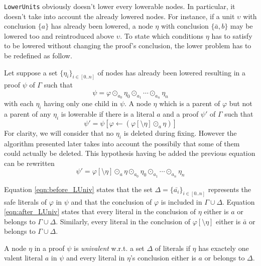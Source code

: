 \documentclass{llncs}
\newcommand{\dual}[1]{{\ensuremath{\bar{#1}}}}
\newcommand{\LowerUnits}{\texttt{LowerUnits}}
\begin{document}
{\LowerUnits} obviously doesn't lower every lowerable nodes. In particular, it doesn't take into
account the already lowered nodes. For instance, if a unit $\upsilon$ with conclusion $\{a\}$ has already been
lowered, a node $\eta$ with conclusion $\{\dual{a},b\}$ may be lowered too and reintroduced above
$\upsilon$. To state which conditions $\eta$ has to satisfy to be lowered without changing the
proof's conclusion, the lower problem has to be redefined as follow.

Let suppose a set $\{\eta_i\}_{i \in [0..n]}$ of nodes has already been lowered resulting in a proof
$\psi$ of $\Gamma$ such that
\begin{equation} \label{eqn:before_LUniv}
  \psi = \varphi \odot_{a_0} \eta_0 \odot_{a_1} \cdots \odot_{a_n} \eta_n
\end{equation}
with each $\eta_i$ having only one child in $\psi$. A node $\eta$ which is a parent of $\varphi$ but
not a parent of any $\eta_i$ is lowerable if there is a literal $a$ and a proof $\psi'$ of
$\Gamma$ such that
\begin{equation}
  \psi' = \psi[\varphi \leftarrow (\varphi[\setminus \eta] \odot_a \eta)]
\end{equation}
For clarity, we will consider that no $\eta_i$ is deleted during fixing. However the algorithm
presented later takes into account the possibily that some of them could actually be deleted. This
hypothesis having be added the previous equation can be rewritten
\begin{equation} \label{eqn:after_LUniv}
  \psi' = \varphi[\setminus \eta] \odot_a \eta \odot_{a_0} \eta_0 \odot_{a_1} \cdots \odot_{a_n} \eta_n
\end{equation}

Equation \ref{eqn:before_LUniv} states that the set $\Delta = \{\dual{a_i}\}_{i \in [0..n]}$
represents the safe literals of $\varphi$ in $\psi$ and that the conclusion of $\varphi$ is included
in $\Gamma \cup \Delta$. Equation \ref{eqn:after_LUniv} states that every literal in the conclusion
of $\eta$ either is $a$ or belongs to $\Gamma \cup \Delta$. Similarly, every literal in the
conclusion of $\varphi[\setminus \eta]$ either is $\dual{a}$ or belongs to $\Gamma \cup \Delta$.

\begin{definition}
A node $\eta$ in a proof $\psi$ is \emph{univalent} w.r.t. a set $\Delta$ of literals if $\eta$ has
exactely one valent literal $a$ in $\psi$ and every literal in $\eta$'s conclusion either is $a$ or
belongs to $\Delta$.
\end{definition}
\end{document}
